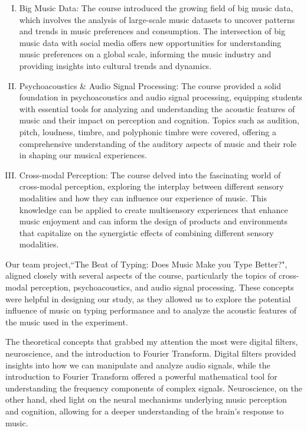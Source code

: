 \documentclass[conference]{IEEEtran}
\begin{document}
\begin{enumerate}[I.]
\item Big Music Data: The course introduced the growing field of big music data, which involves the analysis of large-scale music datasets to uncover patterns and trends in music preferences and consumption. The intersection of big music data with social media offers new opportunities for understanding music preferences on a global scale, informing the music industry and providing insights into cultural trends and dynamics.

\item Psychoacoustics \& Audio Signal Processing: The course provided a solid foundation in psychoacoustics and audio signal processing, equipping students with essential tools for analyzing and understanding the acoustic features of music and their impact on perception and cognition. Topics such as audition, pitch, loudness, timbre, and polyphonic timbre were covered, offering a comprehensive understanding of the auditory aspects of music and their role in shaping our musical experiences.

\item Cross-modal Perception: The course delved into the fascinating world of cross-modal perception, exploring the interplay between different sensory modalities and how they can influence our experience of music. This knowledge can be applied to create multisensory experiences that enhance music enjoyment and can inform the design of products and environments that capitalize on the synergistic effects of combining different sensory modalities.

\end{enumerate}

Our team project,``The Beat of Typing: Does Music Make you Type Better?", aligned closely with several aspects of the course, particularly the topics of cross-modal perception, psychoacoustics, and audio signal processing. These concepts were helpful in designing our study, as they allowed us to explore the potential influence of music on typing performance and to analyze the acoustic features of the music used in the experiment.

The theoretical concepts that grabbed my attention the most were digital filters, neuroscience, and the introduction to Fourier Transform. Digital filters provided insights into how we can manipulate and analyze audio signals, while the introduction to Fourier Transform offered a powerful mathematical tool for understanding the frequency components of complex signals. Neuroscience, on the other hand, shed light on the neural mechanisms underlying music perception and cognition, allowing for a deeper understanding of the brain's response to music.
\end{document}
